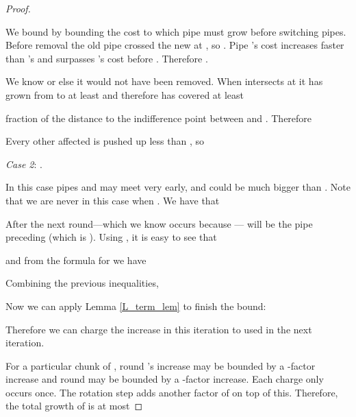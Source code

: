 \documentclass[11pt]{article}
\begin{document}
\begin{proof}
\begin{description}
We bound  by bounding the cost to which pipe  must grow before switching pipes.
Before removal the old pipe  crossed the new  at , 
so .  Pipe 's cost increases faster than 's and surpasses 's cost before .  Therefore .  

We know  or else it would not have been removed.  When  intersects  at  it has grown from  to at least  and therefore has covered at least

fraction of the distance to the indifference point between  and .
Therefore

Every other affected  is pushed up less than , so


\item{\emph{Case 2}:} .

In this case pipes  and  may meet very early, and  could be much bigger than .  Note that we are never in this case when .  We have that

After the next round---which we know occurs because ---
 will be the pipe preceding  (which is ).
Using , it is easy to see that

and from the formula for  we have


Combining the previous inequalities,

Now we can apply Lemma \ref{L_term_lem} to finish the bound:

Therefore we can charge the increase in  this iteration to  used in the next iteration.
\end{description}

For a particular chunk  of , round 's increase may be bounded by a -factor increase and round  may be bounded by a -factor increase.  Each charge only occurs once.
The rotation step adds another factor of  on top of this.
Therefore, the total growth of  is at most

\end{proof}
\end{document}
